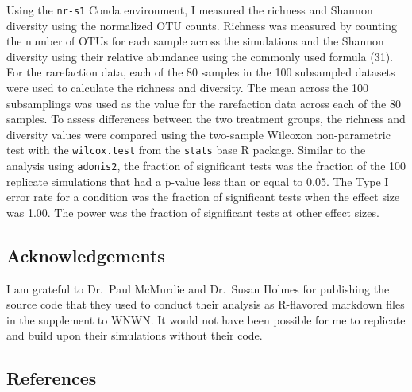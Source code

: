 \documentclass[
]{article}
\begin{document}
Using the \texttt{nr-s1} Conda environment, I measured the richness and
Shannon diversity using the normalized OTU counts. Richness was measured
by counting the number of OTUs for each sample across the simulations
and the Shannon diversity using their relative abundance using the
commonly used formula (31). For the rarefaction data, each of the 80
samples in the 100 subsampled datasets were used to calculate the
richness and diversity. The mean across the 100 subsamplings was used as
the value for the rarefaction data across each of the 80 samples. To
assess differences between the two treatment groups, the richness and
diversity values were compared using the two-sample Wilcoxon
non-parametric test with the \texttt{wilcox.test} from the
\texttt{stats} base R package. Similar to the analysis using
\texttt{adonis2}, the fraction of significant tests was the fraction of
the 100 replicate simulations that had a p-value less than or equal to
0.05. The Type I error rate for a condition was the fraction of
significant tests when the effect size was 1.00. The power was the
fraction of significant tests at other effect sizes.

\hypertarget{acknowledgements}{%
\subsection{Acknowledgements}\label{acknowledgements}}

I am grateful to Dr.~Paul McMurdie and Dr.~Susan Holmes for publishing
the source code that they used to conduct their analysis as R-flavored
markdown files in the supplement to WNWN. It would not have been
possible for me to replicate and build upon their simulations without
their code.

\newpage

\hypertarget{references}{%
\subsection{References}\label{references}}

\setlength{\parindent}{-0.25in}
\setlength{\leftskip}{0.25in}

\noindent
\end{document}

